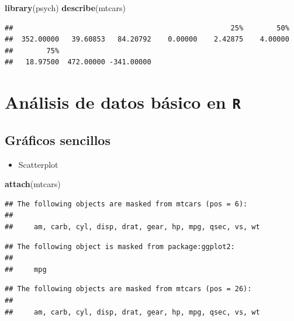 \documentclass[]{book}
\newenvironment{Shaded}{\begin{snugshade}}{\end{snugshade}}
\newcommand{\KeywordTok}[1]{\textcolor[rgb]{0.13,0.29,0.53}{\textbf{#1}}}
\newcommand{\NormalTok}[1]{#1}
\providecommand{\tightlist}{%
  \setlength{\itemsep}{0pt}\setlength{\parskip}{0pt}}
\begin{document}
\begin{Shaded}
\begin{Highlighting}[]
\KeywordTok{library}\NormalTok{(psych)}
\KeywordTok{describe}\NormalTok{(mtcars)}
\end{Highlighting}
\end{Shaded}

\begin{verbatim}
##                                                    25%        50% 
##  352.00000   39.60853   84.20792    0.00000    2.42875    4.00000 
##        75%                       
##   18.97500  472.00000 -341.00000
\end{verbatim}

\chapter{\texorpdfstring{Análisis de datos básico en
\texttt{R}}{Análisis de datos básico en R}}\label{basic}

\section{Gráficos sencillos}\label{graficos-sencillos}

\begin{itemize}
\tightlist
\item
  Scatterplot
\end{itemize}

\begin{Shaded}
\begin{Highlighting}[]
\KeywordTok{attach}\NormalTok{(mtcars)}
\end{Highlighting}
\end{Shaded}

\begin{verbatim}
## The following objects are masked from mtcars (pos = 6):
## 
##     am, carb, cyl, disp, drat, gear, hp, mpg, qsec, vs, wt
\end{verbatim}

\begin{verbatim}
## The following object is masked from package:ggplot2:
## 
##     mpg
\end{verbatim}

\begin{verbatim}
## The following objects are masked from mtcars (pos = 26):
## 
##     am, carb, cyl, disp, drat, gear, hp, mpg, qsec, vs, wt
\end{verbatim}
\end{document}

